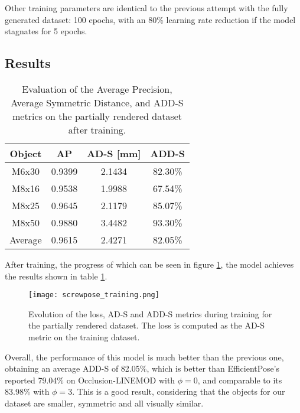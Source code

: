 Other training parameters are identical to the previous attempt with the fully generated dataset: 100 epochs, with an 80\% learning rate reduction if the model stagnates for 5 epochs.

\subsection{Results}

\begin{table}[ht]
    \begin{center}
        \begin{tabular}{|c||c|c|c|}
            \hline
            Object & AP & AD-S [mm] & ADD-S \\
            \hline \hline
            M6x30 & 0.9399 & 2.1434 & 82.30\% \\
            M8x16 & 0.9538 & 1.9988 & 67.54\% \\
            M8x25 & 0.9645 & 2.1179 & 85.07\% \\
            M8x50 & 0.9880 & 3.4482 & 93.30\% \\
            \hline \hline
            Average & 0.9615 & 2.4271 & 82.05\% \\
            \hline    
        \end{tabular}
        \caption{Evaluation of the Average Precision, Average Symmetric Distance, and ADD-S metrics on the partially rendered dataset after training.}
        \label{tab:screwpose}
    \end{center}
\end{table}

After training, the progress of which can be seen in figure \ref{fig:screwpose_training}, the model achieves the results shown in table \ref{tab:screwpose}.

\begin{figure}[ht]
    \texttt{[image: screwpose\_training.png]}
    \caption{Evolution of the loss, AD-S and ADD-S metrics during training for the partially rendered dataset. The loss is computed as the AD-S metric on the training dataset.}
    \label{fig:screwpose_training}
\end{figure}



Overall, the performance of this model is much better than the previous one, obtaining an average ADD-S of 82.05\%, which is better than EfficientPose's reported 79.04\% on Occlusion-LINEMOD with $\phi=0$, and comparable to its 83.98\% with $\phi = 3$. This is a good result, considering that the objects for our dataset are smaller, symmetric and all visually similar.

